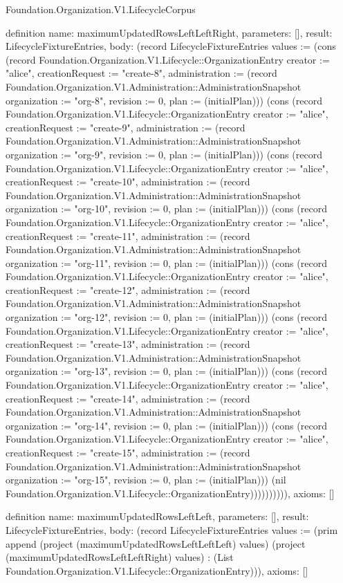 \begin{lexlean}{Foundation.Organization.V1.LifecycleCorpus}
\begin{semanticmodule}
definition{
  name: maximumUpdatedRowsLeftLeftRight,
  parameters: [],
  result: LifecycleFixtureEntries,
  body: (record LifecycleFixtureEntries {values := (cons (record Foundation.Organization.V1.Lifecycle::OrganizationEntry {creator := "alice", creationRequest := "create-8", administration := (record Foundation.Organization.V1.Administration::AdministrationSnapshot {organization := "org-8", revision := 0, plan := (initialPlan)})}) (cons (record Foundation.Organization.V1.Lifecycle::OrganizationEntry {creator := "alice", creationRequest := "create-9", administration := (record Foundation.Organization.V1.Administration::AdministrationSnapshot {organization := "org-9", revision := 0, plan := (initialPlan)})}) (cons (record Foundation.Organization.V1.Lifecycle::OrganizationEntry {creator := "alice", creationRequest := "create-10", administration := (record Foundation.Organization.V1.Administration::AdministrationSnapshot {organization := "org-10", revision := 0, plan := (initialPlan)})}) (cons (record Foundation.Organization.V1.Lifecycle::OrganizationEntry {creator := "alice", creationRequest := "create-11", administration := (record Foundation.Organization.V1.Administration::AdministrationSnapshot {organization := "org-11", revision := 0, plan := (initialPlan)})}) (cons (record Foundation.Organization.V1.Lifecycle::OrganizationEntry {creator := "alice", creationRequest := "create-12", administration := (record Foundation.Organization.V1.Administration::AdministrationSnapshot {organization := "org-12", revision := 0, plan := (initialPlan)})}) (cons (record Foundation.Organization.V1.Lifecycle::OrganizationEntry {creator := "alice", creationRequest := "create-13", administration := (record Foundation.Organization.V1.Administration::AdministrationSnapshot {organization := "org-13", revision := 0, plan := (initialPlan)})}) (cons (record Foundation.Organization.V1.Lifecycle::OrganizationEntry {creator := "alice", creationRequest := "create-14", administration := (record Foundation.Organization.V1.Administration::AdministrationSnapshot {organization := "org-14", revision := 0, plan := (initialPlan)})}) (cons (record Foundation.Organization.V1.Lifecycle::OrganizationEntry {creator := "alice", creationRequest := "create-15", administration := (record Foundation.Organization.V1.Administration::AdministrationSnapshot {organization := "org-15", revision := 0, plan := (initialPlan)})}) (nil Foundation.Organization.V1.Lifecycle::OrganizationEntry)))))))))}),
  axioms: []
}

definition{
  name: maximumUpdatedRowsLeftLeft,
  parameters: [],
  result: LifecycleFixtureEntries,
  body: (record LifecycleFixtureEntries {values := (prim append (project (maximumUpdatedRowsLeftLeftLeft) values) (project (maximumUpdatedRowsLeftLeftRight) values) : (List Foundation.Organization.V1.Lifecycle::OrganizationEntry))}),
  axioms: []
}


\end{semanticmodule}
\end{lexlean}
